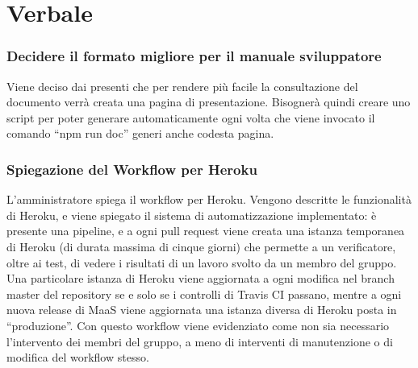\documentclass[11pt]{meetingmins}
\begin{document}
\section{Verbale}

\subsubsection{Decidere il formato migliore per il manuale sviluppatore}
Viene deciso dai presenti che per rendere più facile la consultazione del documento verrà creata una pagina di presentazione. Bisognerà quindi creare uno script per poter generare automaticamente ogni volta che viene invocato il comando ``npm run doc'' generi anche codesta pagina.

\subsubsection{Spiegazione del Workflow per Heroku}
L'amministratore spiega il workflow per Heroku. Vengono descritte le funzionalità di Heroku, e viene spiegato il sistema di automatizzazione implementato: è presente una pipeline, e a ogni pull request viene creata una istanza temporanea di Heroku (di durata massima di cinque giorni) che permette a un verificatore, oltre ai test, di vedere i risultati di un lavoro svolto da un membro del gruppo.
Una particolare istanza di Heroku viene aggiornata a ogni modifica nel branch master del repository se e solo se i controlli di Travis CI passano, mentre a ogni nuova release di MaaS viene aggiornata una istanza diversa di Heroku posta in ``produzione''.
Con questo workflow viene evidenziato come non sia necessario l'intervento dei membri del gruppo, a meno di interventi di manutenzione o di modifica del workflow stesso.

\end{document}
